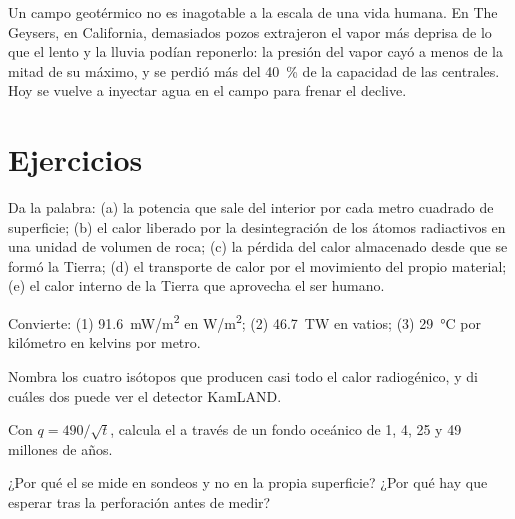 Un campo geotérmico no es inagotable a la escala de una vida humana. En The
Geysers, en California, demasiados pozos extrajeron el vapor más deprisa de
lo que el lento  y la lluvia podían reponerlo: la presión del
vapor cayó a menos de la mitad de su máximo, y se perdió más del
\qty{40}{\percent} de la capacidad de las centrales. Hoy se vuelve a inyectar
agua en el campo para frenar el declive.

\section{Ejercicios}

\begin{exercise}[$\star$]\label{exo:g12:internal-heat:1}
Da la palabra: (a) la potencia que sale del interior por cada metro cuadrado
de superficie; (b) el calor liberado por la desintegración de los átomos
radiactivos en una unidad de volumen de roca; (c) la pérdida del calor
almacenado desde que se formó la Tierra; (d) el transporte de calor por el
movimiento del propio material; (e) el calor interno de la Tierra que
aprovecha el ser humano.
\end{exercise}

\begin{exercise}[$\star$]\label{exo:g12:internal-heat:2}
Convierte: (1) \qty{91.6}{mW/m^2} en \unit{W/m^2}; (2) \qty{46.7}{TW} en
vatios; (3) \qty{29}{\celsius} por kilómetro en kelvins por metro.
\end{exercise}

\begin{exercise}[$\star$]\label{exo:g12:internal-heat:3}
Nombra los cuatro isótopos que producen casi todo el calor radiogénico, y di
cuáles dos puede ver el detector KamLAND.
\end{exercise}

\begin{exercise}[$\star$]\label{exo:g12:internal-heat:4}
Con $q = 490/\sqrt{t}$, calcula el  a través de un fondo
oceánico de 1, 4, 25 y 49 millones de años.
\end{exercise}

\begin{exercise}[$\star$]\label{exo:g12:internal-heat:5}
¿Por qué el  se mide en sondeos y no en la propia superficie?
¿Por qué hay que esperar tras la perforación antes de medir?
\end{exercise}

